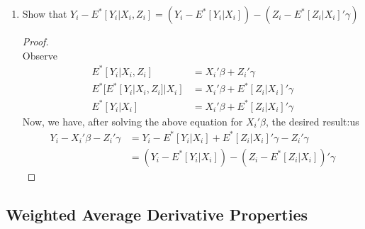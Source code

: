 \documentclass[11pt]{article}
\begin{document}
\begin{enumerate}[label = (\alph*)]
\begin{proof}
		Now, subtract the final line from the first line:
		\begin{align*}
			\underbrace{Y_i - E^*[Y_i|X_i]}_{\tilde Y_i} & = X_i'\beta - X_i'\beta + \underbrace{Z_i'\gamma - E^*[Z_i|X_i]'\gamma}_{\tilde Z_i'\gamma} + \epsilon_i \\
			\tilde Z_i \tilde Y_i & = \tilde Z_i \tilde Z_i'\gamma + \tilde Z_i\epsilon_i\\
			E[\tilde Z_i \tilde Y_i]& = E[\tilde Z_i \tilde Z_i']\gamma + E[\tilde Z_i\epsilon_i]
		\end{align*}
		Observe that $E[\tilde Z_i\epsilon_i] = 0$ since $\tilde Z_i$ is a linear combination of $Z_i$ and $X_i$, both of which have mean zero correlation with $\epsilon_i$. More precisely, write $E^*[Z_i|X_i] = \Pi X_i$ for some matrix of coefficients of $\Pi$. So,
		$$E[\tilde Z_i \epsilon_i] = E[Z_i \epsilon_i] - E[\Pi X_i\epsilon_i] = 0 - \Pi 0 = 0.$$
		Thus, we have
		$$E[\tilde Z_i \tilde Y_i] = E[\tilde Z_i \tilde Z_i']\gamma,$$
		which after rearranging becomes $\gamma = E[\tilde Z_i \tilde Z_i']^{-1}E[\tilde Z_i \tilde Y_i],$ the desired result.
	\end{proof}
	\item Show that $Y_i - E^*[Y_i|X_i, Z_i] = (Y_i - E^*[Y_i|X_i]) - (Z_i - E^*[Z_i|X_i]'\gamma)$
	\begin{proof}\mbox{}\\
		Observe
		\begin{align*}
			E^*[Y_i|X_i,Z_i] & = X_i'\beta + Z_i'\gamma \\
			E^*[E^*[Y_i|X_i,Z_i]|X_i] & = X_i'\beta + E^*[Z_i|X_i]'\gamma \\
			E^*[Y_i|X_i] & = X_i'\beta + E^*[Z_i|X_i]'\gamma
		\end{align*}
		Now, we have, after solving the above equation for $X_i'\beta$, the desired result:us
		\begin{align*}
		Y_i - X_i'\beta - Z_i'\gamma & = Y_i - E^*[Y_i|X_i] + E^*[Z_i|X_i]'\gamma - Z_i'\gamma \\
		& = (Y_i - E^*[Y_i|X_i]) - (Z_i - E^*[Z_i|X_i])'\gamma
		\end{align*}
	\end{proof}
\end{enumerate}

\subsection*{Weighted Average Derivative Properties}
\end{document}
